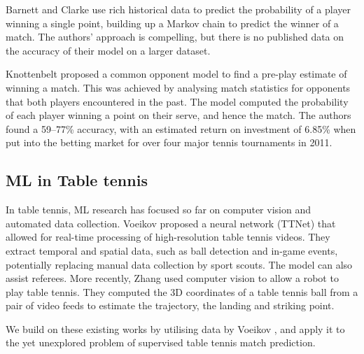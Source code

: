Barnett and Clarke \cite{barnett2005combining} use rich historical data to predict the probability of a player winning a single point, building up a Markov chain to predict the winner of a match. The authors' approach is compelling, but there is no published data on the accuracy of their model on a larger dataset.

Knottenbelt \etal \cite{knottenbelt2012common} proposed a common opponent model to find a pre-play estimate of winning a match. This was achieved by analysing match statistics for opponents that both players encountered in the past. %
The model computed the probability of each player winning a point on their serve, and hence the match. The authors found a 59--77\% accuracy, with an estimated return on investment of 6.85\% when put into the betting market for over four major tennis tournaments in 2011. 



\subsection{ML in Table tennis}
In table tennis, ML research has focused so far on computer vision and automated data collection. %
Voeikov \etal \cite{voeikov2020ttnet} proposed a neural network (TTNet) that allowed for real-time processing of high-resolution table tennis videos. They extract temporal and spatial data, such as ball detection and in-game events,  potentially replacing manual data collection by sport scouts. The model can also assist referees. More recently, Zhang \etal \cite{zhang2010visual} used computer vision to allow a robot to play table tennis. They computed the 3D coordinates of a table tennis ball from a pair of video feeds to estimate the trajectory, the landing and striking point.

We build on these existing works by utilising data by Voeikov \etal \cite{voeikov2020ttnet}, and apply it to the yet unexplored problem of supervised table tennis match prediction.



